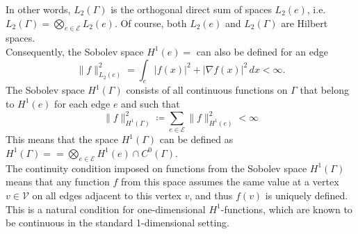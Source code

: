 In other words, $L_2(\Gamma)$ is the orthogonal direct sum of spaces $L_2(e)$, i.e. $L_2(\Gamma) = \bigotimes_{e \in \mathcal{E}} L_2(e)$. Of course, both $L_2(e)$ and $L_2(\Gamma)$ are Hilbert spaces. \\
Consequently, the Sobolev space $H^1 (e) = $ can also be defined for an edge
\begin{equation*}
    \lVert f \rVert^{2}_{L_2(e)} = \int_e \lvert f(x) \rvert^2 + \lvert \nabla f(x) \rvert^2 \, dx < \infty.
\end{equation*}
The Sobolev space $H^1 (\Gamma)$ consists of all continuous functions on $\Gamma$ that belong to $H^1 (e)$ for each edge $e$ and such that 
\begin{equation*} 
    \lVert f \rVert^{2}_{H^1 (\Gamma)} \coloneqq \sum_{e \in \mathcal{E}} \lVert f \rVert^{2}_{H^1 (e)} < \infty
\end{equation*}
This means that the space $H^1 (\Gamma)$ can be defined as $H^1 (\Gamma) = = \bigotimes_{e \in \mathcal{E}} H^1 (e)\cap C^{0}(\Gamma)$.\\
The continuity condition imposed on functions from the Sobolev space $H^1 (\Gamma)$ means that any function $f$ from this space assumes the same value at a vertex $v \in \mathcal{V}$ on all edges adjacent to this vertex $v$, and thus $f(v)$ is uniquely defined. This is a natural condition for one-dimensional $H^1$-functions, which are known to be continuous in the standard 1-dimensional setting. \\

